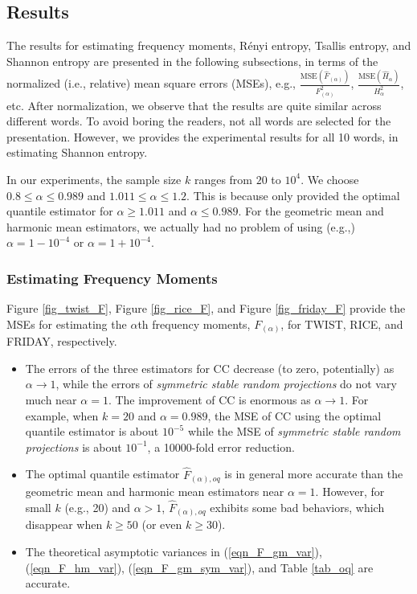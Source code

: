 \documentclass{sig-alternate}
\begin{document}
\subsection{Results}

The results for estimating frequency moments, R\'enyi entropy, Tsallis entropy, and Shannon entropy are presented in the following subsections, in terms of the normalized (i.e., relative) mean square errors (MSEs), e.g., $\frac{\text{MSE}\left(\hat{F}_{(\alpha)}\right)}{F_{(\alpha)}^2}$, $\frac{\text{MSE}\left(\hat{H}_{\alpha}\right)}{H_{\alpha}^2}$, etc. After normalization, we observe that the results are quite similar across different words. To avoid boring the readers, not all words are selected for the presentation. However, we provides the experimental results for all 10 words, in estimating Shannon entropy.

In our experiments, the sample size $k$ ranges from $20$ to $10^4$. We choose $0.8\leq \alpha\leq 0.989$ and $1.011 \leq \alpha\leq 1.2$. This is because \cite{Report:Li_CC_oq} only provided the optimal quantile estimator for $\alpha\geq 1.011$ and $\alpha\leq 0.989$. For the geometric mean and harmonic mean estimators, we actually had no problem of using (e.g.,) $\alpha = 1-10^{-4}$ or $\alpha = 1+10^{-4}$.

\subsubsection{Estimating Frequency Moments}




Figure \ref{fig_twist_F}, Figure \ref{fig_rice_F}, and Figure \ref{fig_friday_F} provide the MSEs for estimating the $\alpha$th  frequency moments, $F_{(\alpha)}$, for TWIST, RICE, and FRIDAY, respectively.
\begin{itemize}
\item The errors of the three estimators for CC decrease (to zero, potentially) as $\alpha\rightarrow 1$, while the errors of {\em symmetric stable random projections} do not vary much near $\alpha=1$. The improvement of CC is enormous as $\alpha\rightarrow 1$. For example, when $k = 20$ and $\alpha = 0.989$, the MSE of CC using the optimal quantile estimator is about $10^{-5}$ while the MSE of {\em symmetric stable random projections} is about $10^{-1}$, a 10000-fold error reduction.
\item The optimal quantile estimator $\hat{F}_{(\alpha),oq}$ is in general more accurate than the geometric mean and harmonic mean estimators near $\alpha =1$. However, for small $k$ (e.g., 20) and $\alpha>1$, $\hat{F}_{(\alpha),oq}$ exhibits some bad behaviors, which disappear when $k\geq 50$ (or even $k \geq 30$).
\item The theoretical asymptotic variances in (\ref{eqn_F_gm_var}), (\ref{eqn_F_hm_var}), (\ref{eqn_F_gm_sym_var}), and Table \ref{tab_oq} are accurate.
\end{itemize}
\end{document}

